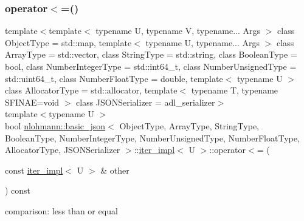 \subsubsection{\texorpdfstring{operator$<$=()}{operator<=()}}
{\footnotesize\ttfamily template$<$template$<$ typename U, typename V, typename... Args $>$ class Object\+Type = std\+::map, template$<$ typename U, typename... Args $>$ class Array\+Type = std\+::vector, class String\+Type  = std\+::string, class Boolean\+Type  = bool, class Number\+Integer\+Type  = std\+::int64\+\_\+t, class Number\+Unsigned\+Type  = std\+::uint64\+\_\+t, class Number\+Float\+Type  = double, template$<$ typename U $>$ class Allocator\+Type = std\+::allocator, template$<$ typename T, typename S\+F\+I\+N\+A\+E=void $>$ class J\+S\+O\+N\+Serializer = adl\+\_\+serializer$>$ \\
template$<$typename U $>$ \\
bool \mbox{\hyperlink{classnlohmann_1_1basic__json}{nlohmann\+::basic\+\_\+json}}$<$ Object\+Type, Array\+Type, String\+Type, Boolean\+Type, Number\+Integer\+Type, Number\+Unsigned\+Type, Number\+Float\+Type, Allocator\+Type, J\+S\+O\+N\+Serializer $>$\+::\mbox{\hyperlink{classnlohmann_1_1basic__json_1_1iter__impl}{iter\+\_\+impl}}$<$ U $>$\+::operator$<$= (\begin{DoxyParamCaption}\item[{const \mbox{\hyperlink{classnlohmann_1_1basic__json_1_1iter__impl}{iter\+\_\+impl}}$<$ U $>$ \&}]{other }\end{DoxyParamCaption}) const\hspace{0.3cm}{\ttfamily [inline]}}



comparison\+: less than or equal 

